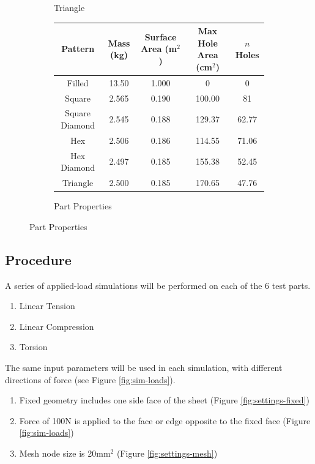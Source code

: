 \documentclass[12pt, letterpaper]{article}
\begin{document}
\begin{figure}[H]
\begin{subfigure}[b]{.3\linewidth}
		\caption{Triangle}
	\end{subfigure}
	\begin{subfigure}[b]{\linewidth}
	\begingroup
	\setlength{\tabcolsep}{10pt} %
	\renewcommand{\arraystretch}{1.5} %
		\begin{tabular}{ | c | c | c | c | c | }\hline
			Pattern 			& Mass (kg) 	& Surface Area (m$^2$)	& Max Hole Area (cm$^2$) 		& $n$ Holes 	\\\hline
			Filled				& 13.50 		& 1.000 					& 0			 						& 0				\\\hline
			Square				& 2.565 		& 0.190 					& 100.00		 					& 81			\\\hline
			Square Diamond	& 2.545 		& 0.188 					& 129.37	 						& 62.77		\\\hline
			Hex				& 2.506 		& 0.186 					& 114.55	 						& 71.06		\\\hline
			Hex Diamond		& 2.497 		& 0.185 					& 155.38	 						& 52.45		\\\hline
			Triangle			& 2.500 		& 0.185					& 170.65				 			& 47.76		\\\hline
		\end{tabular}
		\caption{Part Properties}
	\endgroup
	\end{subfigure}
\end{figure}

\newpage
\subsection{Procedure}
\label{sec:procedure}

A series of applied-load simulations will be performed on each of the 6 test parts. 

\begin{enumerate}
\item Linear Tension
\item Linear Compression
\item Torsion
\end{enumerate}

The same input parameters will be used in each simulation, with different directions of force (see Figure \ref{fig:sim-loads}). 

\begin{enumerate}
\item Fixed geometry includes one side face of the sheet (Figure \ref{fig:settings-fixed})
\item Force of 100N is applied to the face or edge opposite to the fixed face (Figure \ref{fig:sim-loads})
\item Mesh node size is 20mm$^2$ (Figure \ref{fig:settings-mesh})
\end{enumerate}
\end{document}
